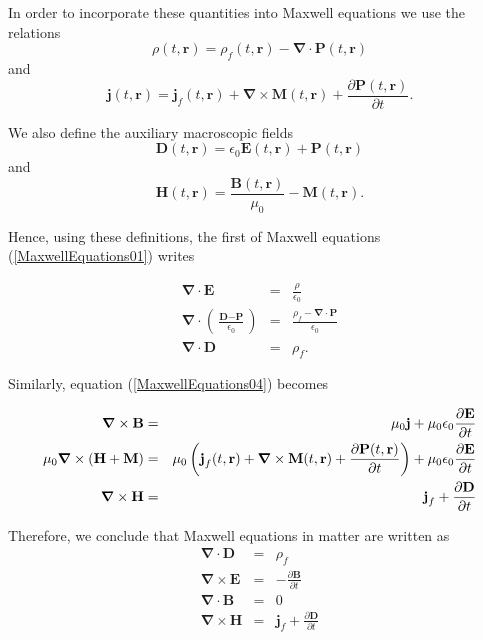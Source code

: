 In order to incorporate these quantities into Maxwell equations we use the relations
\begin{equation}
\rho (t,\textbf{r}) = \rho_f (t,\textbf{r}) - \boldsymbol{\nabla} \cdot \textbf{P} (t,\textbf{r})
\end{equation}
and
\begin{equation}
\textbf{j} (t,\textbf{r}) = \textbf{j}_f (t,\textbf{r}) + \boldsymbol{\nabla} \times \textbf{M} (t,\textbf{r})  + \frac{\partial \textbf{P} (t,\textbf{r})}{\partial t}.
\end{equation}

We also define the auxiliary macroscopic fields 
\begin{equation}
\textbf{D} (t,\textbf{r}) = \epsilon_0 \textbf{E} (t,\textbf{r}) + \textbf{P} (t,\textbf{r})
\end{equation}
and
\begin{equation}
\textbf{H} (t,\textbf{r})  = \frac{\textbf{B}(t,\textbf{r})}{\mu_0} - \textbf{M}(t,\textbf{r}).
\end{equation}

Hence, using these definitions, the first of Maxwell equations (\ref{MaxwellEquations01}) writes

\begin{eqnarray}
\boldsymbol{\nabla} \cdot \textbf{E} &=& \frac{\rho}{\epsilon_0} \\
\boldsymbol{\nabla} \cdot \left( \frac{\textbf{D} - \textbf{P} }{\epsilon_0}\right) &=& \frac{\rho_f - \boldsymbol{\nabla} \cdot \textbf{P}}{\epsilon_0} \\
\boldsymbol{\nabla} \cdot \textbf{D} &=& \rho_f .
\end{eqnarray}

Similarly, equation (\ref{MaxwellEquations04}) becomes

\begin{eqnarray}
\boldsymbol{\nabla} \times \textbf{B} &=& \mu_0 \textbf{j} + \mu_0 \epsilon_0  \frac{\partial \textbf{E}}{\partial t} \\
\mu_0 \boldsymbol{\nabla} \times \left(  \textbf{H} + \textbf{M} \right) &=& \mu_0 \left( \textbf{j}_f (t,\textbf{r}) + \boldsymbol{\nabla} \times \textbf{M} (t,\textbf{r})  + \frac{\partial \textbf{P} (t,\textbf{r})}{\partial t} \right) + \mu_0 \epsilon_0  \frac{\partial \textbf{E}}{\partial t} \notag \\
\boldsymbol{\nabla} \times \textbf{H} &=&  \textbf{j}_f + \frac{\partial \textbf{D}}{\partial t}
\end{eqnarray}



Therefore, we conclude that Maxwell equations in matter are written as 
\begin{eqnarray}
\boldsymbol{\nabla} \cdot \textbf{D} &=& \rho_f \\
\boldsymbol{\nabla} \times \textbf{E} &=& -\frac{\partial \textbf{B}}{\partial t} \\
\boldsymbol{\nabla} \cdot \textbf{B} &=& 0 \\
\boldsymbol{\nabla} \times \textbf{H} &=&  \textbf{j}_f + \frac{\partial \textbf{D}}{\partial t}
\end{eqnarray}